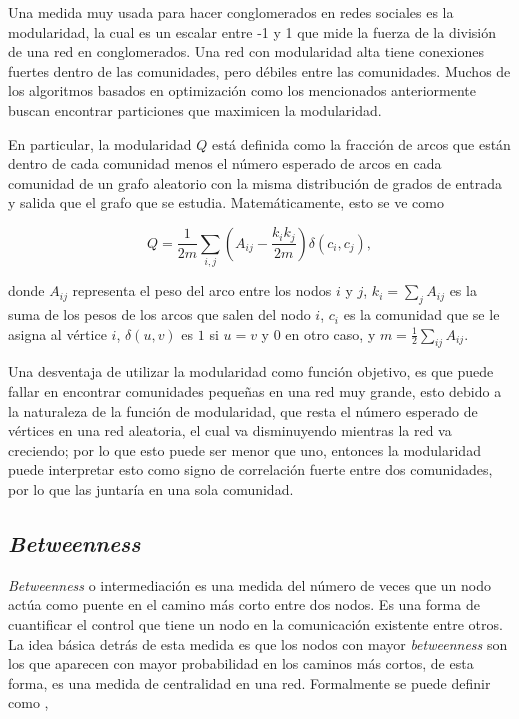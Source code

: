 \documentclass{article}
\begin{document}
Una medida muy usada para hacer conglomerados en redes sociales es la modularidad, la cual es un escalar entre -1 y 1 que mide la fuerza de la división de una red en conglomerados. Una red con modularidad alta tiene conexiones fuertes dentro de las comunidades, pero débiles entre las comunidades. Muchos de los algoritmos basados en optimización como los mencionados anteriormente buscan encontrar particiones que maximicen la modularidad.

En particular, la modularidad $Q$ está definida como la fracción de arcos que están dentro de cada comunidad menos el número esperado de arcos en cada comunidad de un grafo aleatorio con la misma distribución de grados de entrada y salida que el grafo que se estudia. Matemáticamente, esto se ve como\cite{blondel_fast_2008}

\begin{equation}
Q = \frac{1}{2m} \sum_{i,j} (A_{ij} - \frac{k_i k_j}{2m}) \delta (c_i, c_j),
\end{equation}

donde $A_{ij}$ representa el peso del arco entre los nodos $i$ y $j$, $k_i = \sum_j A_{ij}$ es la suma de los pesos de los arcos que salen del nodo $i$, $c_i$ es la comunidad que se le asigna al vértice $i$, $\delta(u,v)$ es $1$ si $u=v$ y $0$ en otro caso, y $m = \frac{1}{2} \sum_{ij} A_{ij}$.

Una desventaja de utilizar la modularidad como función objetivo, es que puede fallar en encontrar comunidades pequeñas en una red muy grande, esto debido a la naturaleza de la función de modularidad, que resta el número esperado de vértices en una red aleatoria, el cual va disminuyendo mientras la red va creciendo; por lo que esto puede ser menor que uno, entonces la modularidad puede interpretar esto como signo de correlación fuerte entre dos comunidades, por lo que las juntaría en una sola comunidad.

\subsection{\textit{Betweenness}}

\textit{Betweenness} o intermediación es una medida del número de veces que un nodo actúa como puente en el camino más corto entre dos nodos. Es una forma de cuantificar el control que tiene  un nodo en la comunicación existente entre otros. La idea básica detrás de esta medida es que los nodos con mayor \textit{betweenness} son los que aparecen con mayor probabilidad en los caminos más cortos, de esta forma, es una medida de centralidad en una red. Formalmente se puede definir como \cite{sun_survey_2011},
\end{document}
